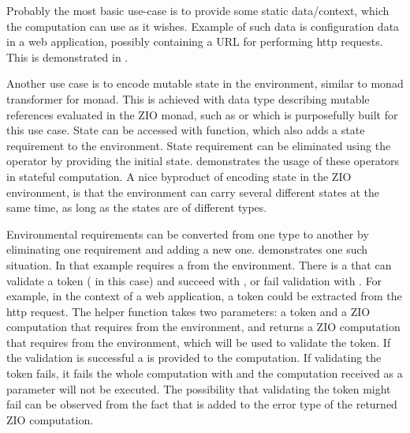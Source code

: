 Probably the most basic use-case is to provide some static data/context, which the computation can use as it wishes. Example of such data is configuration data in a web application, possibly containing a URL for performing http requests. This is demonstrated in .



Another use case is to encode mutable state in the environment, similar to monad transformer for  monad. This is achieved with data type describing mutable references evaluated in the ZIO monad, such as  or  which is purposefully built for this use case. State can be accessed with  function, which also adds a state requirement to the environment. State requirement can be eliminated using the  operator by providing the initial state.  demonstrates the usage of these operators in stateful computation. A nice byproduct of encoding state in the ZIO environment, is that the environment can carry several different states at the same time, as long as the states are of different types.



Environmental requirements can be converted from one type to another by eliminating one requirement and adding a new one.  demonstrates one such situation. In that example  requires a  from the environment. There is a  that can validate a token ( in this case) and succeed with , or fail validation with . For example, in the context of a web application, a token could be extracted from the http request. The helper function  takes two parameters: a token and a ZIO computation that requires  from the environment, and returns a ZIO computation that requires  from the environment, which will be used to validate the token. If the validation is successful a  is provided to the computation. If validating the token fails, it fails the whole computation with  and the computation received as a parameter will not be executed. The possibility that validating the token might fail can be observed from the fact that   is added to the error type of the returned ZIO computation.

